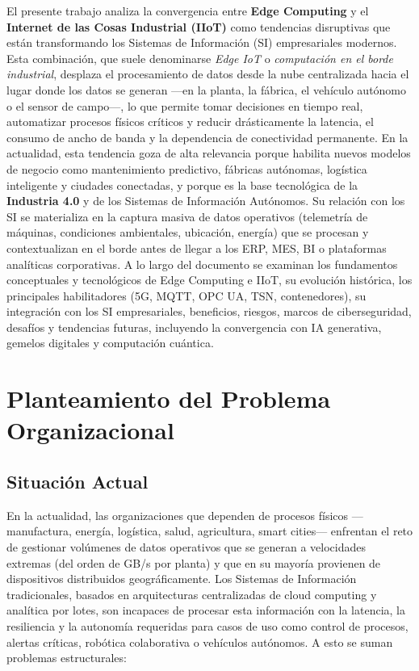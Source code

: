 ﻿\documentclass[12pt,a4paper,oneside]{article}
\begin{document}
El presente trabajo analiza la convergencia entre \textbf{Edge Computing} y el \textbf{Internet de las Cosas Industrial (IIoT)} como tendencias disruptivas que están transformando los Sistemas de Información (SI) empresariales modernos. Esta combinación, que suele denominarse \emph{Edge IoT} o \emph{computación en el borde industrial}, desplaza el procesamiento de datos desde la nube centralizada hacia el lugar donde los datos se generan ---en la planta, la fábrica, el vehículo autónomo o el sensor de campo---, lo que permite tomar decisiones en tiempo real, automatizar procesos físicos críticos y reducir drásticamente la latencia, el consumo de ancho de banda y la dependencia de conectividad permanente. En la actualidad, esta tendencia goza de alta relevancia porque habilita nuevos modelos de negocio como mantenimiento predictivo, fábricas autónomas, logística inteligente y ciudades conectadas, y porque es la base tecnológica de la \textbf{Industria 4.0} y de los Sistemas de Información Autónomos. Su relación con los SI se materializa en la captura masiva de datos operativos (telemetría de máquinas, condiciones ambientales, ubicación, energía) que se procesan y contextualizan en el borde antes de llegar a los ERP, MES, BI o plataformas analíticas corporativas. A lo largo del documento se examinan los fundamentos conceptuales y tecnológicos de Edge Computing e IIoT, su evolución histórica, los principales habilitadores (5G, MQTT, OPC UA, TSN, contenedores), su integración con los SI empresariales, beneficios, riesgos, marcos de ciberseguridad, desafíos y tendencias futuras, incluyendo la convergencia con IA generativa, gemelos digitales y computación cuántica.

\section{Planteamiento del Problema Organizacional}

\subsection{Situación Actual}

En la actualidad, las organizaciones que dependen de procesos físicos ---manufactura, energía, logística, salud, agricultura, smart cities--- enfrentan el reto de gestionar volúmenes de datos operativos que se generan a velocidades extremas (del orden de GB/s por planta) y que en su mayoría provienen de dispositivos distribuidos geográficamente. Los Sistemas de Información tradicionales, basados en arquitecturas centralizadas de cloud computing y analítica por lotes, son incapaces de procesar esta información con la latencia, la resiliencia y la autonomía requeridas para casos de uso como control de procesos, alertas críticas, robótica colaborativa o vehículos autónomos. A esto se suman problemas estructurales:
\end{document}
